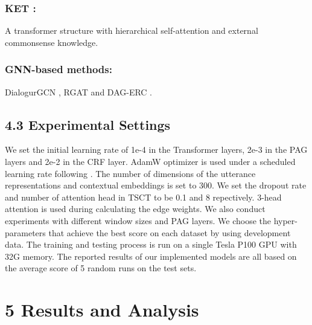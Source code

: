 \documentclass[letterpaper]{article} \usepackage{aaai22}  \usepackage{times}  \usepackage{helvet}  \usepackage{courier}  \usepackage[hyphens]{url}  \usepackage{graphicx} \urlstyle{rm} \def\UrlFont{\rm}  \usepackage{natbib}  \usepackage{caption} \DeclareCaptionStyle{ruled}{labelfont=normalfont,labelsep=colon,strut=off} \frenchspacing  \setlength{\pdfpagewidth}{8.5in}  \setlength{\pdfpageheight}{11in}  \usepackage{algorithm}
\begin{document}
\subsubsection{KET \cite{ket}:} A transformer structure with hierarchical self-attention and external commonsense knowledge.
\subsubsection{GNN-based methods:} DialogurGCN \cite{dialoguegcn}, RGAT \cite{rgat} and DAG-ERC \cite{dag}.

\subsection{4.3 Experimental Settings}
We set the initial learning rate of 1e-4 in the Transformer layers, 2e-3 in the PAG layers and 2e-2 in the CRF layer. AdamW optimizer is used under a scheduled learning rate following \cite{transformer}. The number of dimensions of the utterance representations and contextual embeddings is set to 300. We set the dropout rate and number of attention head in TSCT to be 0.1 and 8 repectively. 3-head attention is used during calculating the edge weights. We also conduct experiments with different window sizes and PAG layers. We choose the hyper-parameters that achieve the best score on each dataset by using development data. The training and testing process is run on a single Tesla P100 GPU with 32G memory. The reported results of our implemented models are all based on
the average score of 5 random runs on the test sets.
\section{5 Results and Analysis}

\begin{table}[t]
	\centering
	\caption{Overall performance on the four datasets. 
}
	\label{tab:overall}
\end{table}
\end{document}
